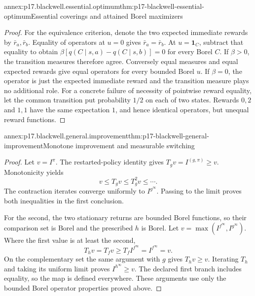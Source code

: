 \begin{annexitem}{annex:p17.blackwell.essential.optimum}{thm:p17-blackwell-essential-optimum}{Essential coverings and attained Borel maximizers}
\begin{proof}
For the equivalence criterion, denote the two expected
immediate rewards by \(\bar r_a,\bar r_b\).
Equality of operators at \(u=0\) gives
\(\bar r_a=\bar r_b\). At \(u=\mathbf1_C\), subtract
that equality to obtain
\(\beta[q(C\mid s,a)-q(C\mid s,b)]=0\) for every
Borel \(C\). If \(\beta>0\), the transition measures
therefore agree. Conversely equal measures and equal
expected rewards give equal operators for every bounded
Borel \(u\). If \(\beta=0\), the operator is just
the expected immediate reward and the transition measure
plays no additional role.
For a concrete failure of necessity of pointwise reward
equality, let the common transition put probability
\(1/2\) on each of two states. Rewards \(0,2\) and
\(1,1\) have the same expectation \(1\), and hence
identical operators, but unequal reward functions.
\end{proof}
\end{annexitem}

\begin{annexitem}{annex:p17.blackwell.general.improvement}{thm:p17-blackwell-general-improvement}{Monotone improvement and measurable switching}
\begin{proof}
Let \(v=I^\pi\). The restarted-policy identity gives
\(T_gv=I^{(g,\pi)}\geq v\). Monotonicity yields
\[
             v\leq T_gv\leq T_g^2v\leq\cdots.
\]
The contraction iterates converge uniformly to
\(I^{g^\infty}\). Passing to the limit proves both
inequalities in the first conclusion.

For the second, the two stationary returns are bounded
Borel functions, so their comparison set is Borel and
the prescribed \(h\) is Borel. Let
\(v=\max(I^{f^\infty},I^{g^\infty})\).
Where the first value is at least the second,
\[
        T_hv=T_fv\geq T_fI^{f^\infty}
                    =I^{f^\infty}=v.
\]
On the complementary set the same argument with \(g\)
gives \(T_hv\geq v\). Iterating \(T_h\) and taking its
uniform limit proves \(I^{h^\infty}\geq v\).
The declared first branch includes equality, so the map
is defined everywhere. These arguments use only the
bounded Borel operator properties proved above.
\end{proof}
\end{annexitem}

